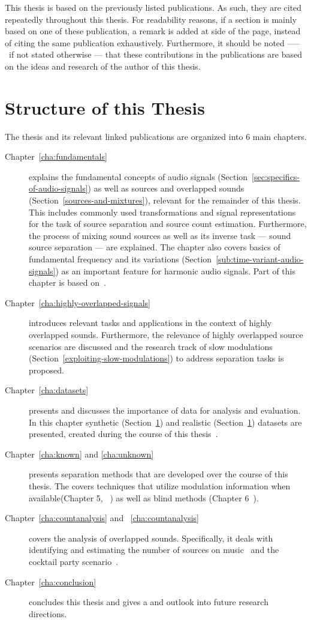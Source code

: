 This thesis is based on the previously listed publications. As such, they are cited repeatedly throughout this thesis. For readability reasons, if a section is mainly based on one of these publication, a remark is added at side of the page, instead of citing the same publication exhaustively. Furthermore, it should be noted ––– if not stated otherwise ---  that these contributions in the publications are based on the ideas and research of the author of this thesis.

\section{Structure of this Thesis}

The thesis and its relevant linked publications are organized into 6 main chapters.
\begin{description}
  \item[Chapter~\ref{cha:fundamentals}] explains the fundamental concepts of audio signals (Section~\ref{sec:specifics-of-audio-signals}) as well as sources and overlapped sounds (Section~\ref{sources-and-mixtures}), relevant for the remainder of this thesis. 
  This includes commonly used transformations and signal representations for the task of source separation and source count estimation.
  Furthermore, the process of mixing sound sources as well as its inverse task --- sound source separation --- are explained.
  The chapter also covers basics of fundamental frequency and its variations (Section~\ref{sub:time-variant-audio-signals}) as an important feature for harmonic audio signals.
  Part of this chapter is based on~\cite{rafii18}.
  \item[Chapter~\ref{cha:highly-overlapped-signals}] introduces relevant tasks and applications in the context of highly overlapped sounds.
  Furthermore, the relevance of highly overlapped source scenarios are discussed and the research track of slow  modulations (Section~\ref{exploiting-slow-modulations}) to address separation tasks is proposed.
  \item[Chapter~\ref{cha:datasets}] presents and discusses the importance of data for analysis and evaluation.
  In this chapter synthetic (Section~\ref{}) and realistic (Section~\ref{}) datasets are presented, created during the course of this thesis~\cite{oss_wice, oss_unison, oss_libricount, stoeter15acm, liutkus17}.
  \item[Chapter~\ref{cha:known} and \ref{cha:unknown}] presents separation methods that are developed over the course of this thesis. 
  The covers techniques that utilize modulation information when available(Chapter 5, ~\cite{stoeter14, stoeter15icassp}) as well as blind methods (Chapter 6~\cite{stoeter16, liutkus17}).
  \item[Chapter~\ref{cha:countanalysis} and ~\ref{cha:countanalysis}] covers the analysis of overlapped sounds. Specifically, it deals with identifying and estimating the number of sources on music~\cite{schoeffler13, stoeter13} and the cocktail party scenario~\cite{stoeter19, stoeter18}.
  \item[Chapter~\ref{cha:conclusion}] concludes this thesis and gives a and outlook into future research directions.
\end{description}
